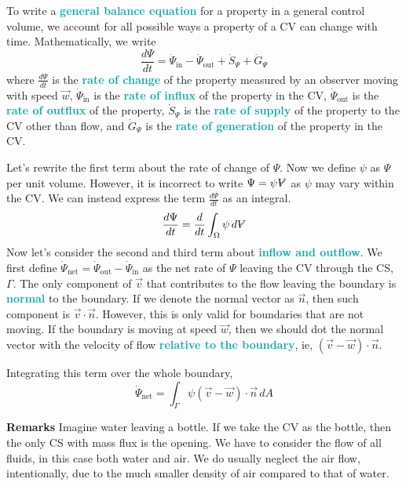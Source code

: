 \documentclass[twoside]{article}
\makeatletter
\DeclareRobustCommand{\vol}{\text{\volumedash}V}
\newcommand{\volumedash}{%
	\makebox[0pt][l]{%
		\ooalign{\hfil\hphantom{$\m@th V$}\hfil\cr\kern0.16em\rotatebox{27.5}{\textbf{--}}\hfil\cr}%
	}%
}
\newcommand{\remarks}[1]{\begin{remarksbox} \emoji{blueberries} \textbf{Remarks} \newline #1 \end{remarksbox}}
\newcommand{\highlightbluetext}[1]{\textcolor[HTML]{09ACA6}{\textbf{#1}}}
\numberwithin{equation}{section}
\makeatother
\begin{document}
	To write a \highlightbluetext{general balance equation} for a property in a general control volume, we account for all possible ways a property of a CV can change with time. Mathematically, we write
	\begin{equation}
		\frac{d\Psi}{dt} = \dot{\Psi}_{\text{in}}-\dot{\Psi}_{\text{out}}+\dot{S}_\Psi+\dot{G}_\Psi
		\label{eq:GeneralBalanceEquation}
	\end{equation}
	where $\frac{d\Psi}{dt}$ is the \highlightbluetext{rate of change} of the property measured by an observer moving with speed $\vec{w}$, $\dot{\Psi}_{\text{in}}$ is the \highlightbluetext{rate of influx} of the property in the CV, $\dot{\Psi}_{\text{out}}$ is the \highlightbluetext{rate of outflux} of the property, $\dot{S}_\Psi$ is the \highlightbluetext{rate of supply} of the property to the CV other than flow, and $\dot{G}_\Psi$ is the \highlightbluetext{rate of generation} of the property in the CV.

	Let's rewrite the first term about the rate of change of $\Psi$. Now we define $\psi$ as $\Psi$ per unit volume. However, it is incorrect to write $\Psi = \psi \vol$ as $\psi$ may vary within the CV. We can instead express the term $\frac{d\Psi}{dt}$ as an integral.
	\begin{equation}
		\frac{d\Psi}{dt} = \frac{d}{dt} \int_\Omega \psi \, d\vol
		\label{eq:RateOfChangeOfPsiIntegral}
	\end{equation}
	Now let's consider the second and third term about \highlightbluetext{inflow and outflow}. We first define $\dot{\Psi}_{\text{net}} = \dot{\Psi}_{\text{out}}-\dot{\Psi}_{\text{in}}$ as the net rate of $\Psi$ leaving the CV through the CS, $\Gamma$. The only component of $\vec{v}$ that contributes to the flow leaving the boundary is \highlightbluetext{normal} to the boundary. If we denote the normal vector as $\vec{n}$, then such component is $\vec{v} \cdot \vec{n}$. However, this is only valid for boundaries that are not moving. If the boundary is moving at speed $\vec{w}$, then we should dot the normal vector with the velocity of flow \highlightbluetext{relative to the boundary}, ie, $(\vec{v}-\vec{w}) \cdot \vec{n}$.
	
	Integrating this term over the whole boundary,
	\begin{equation}
		\dot{\Psi}_{\text{net}} = \int_\Gamma \psi (\vec{v}-\vec{w}) \cdot \vec{n} \, dA
		\label{eq:NetFluxIntegral}
	\end{equation}
	\remarks{Imagine water leaving a bottle. If we take the CV as the bottle, then the only CS with mass flux is the opening. We have to consider the flow of all fluids, in this case both water and air. We do usually neglect the air flow, intentionally, due to the much smaller density of air compared to that of water.}
	
\end{document}
